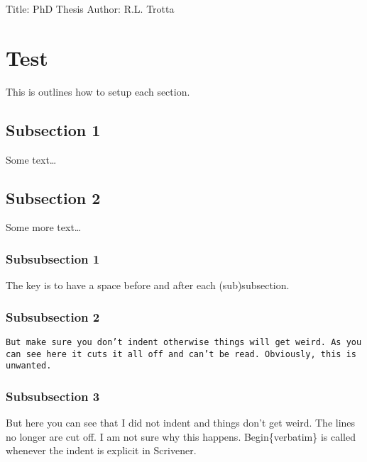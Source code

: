 \documentclass[
]{report}
\author{}
\date{}
\begin{document}
Title: PhD Thesis Author: R.L. Trotta

\label{Chapter-1}

\hypertarget{Section-1.1}{%
\section{Test}\label{Section-1.1}}

This is outlines how to setup each section.

\hypertarget{subsection-1}{%
\subsection{Subsection 1}\label{subsection-1}}

Some text\ldots{}

\hypertarget{subsection-2}{%
\subsection{Subsection 2}\label{subsection-2}}

Some more text\ldots{}

\hypertarget{subsubsection-1}{%
\subsubsection{Subsubsection 1}\label{subsubsection-1}}

The key is to have a space before and after each (sub)subsection.

\hypertarget{subsubsection-2}{%
\subsubsection{Subsubsection 2}\label{subsubsection-2}}

\begin{verbatim}
But make sure you don’t indent otherwise things will get weird. As you can see here it cuts it all off and can’t be read. Obviously, this is unwanted.
\end{verbatim}

\hypertarget{subsubsection-3}{%
\subsubsection{Subsubsection 3}\label{subsubsection-3}}

But here you can see that I did not indent and things don't get weird.
The lines no longer are cut off. I am not sure why this happens.
Begin\{verbatim\} is called whenever the indent is explicit in
Scrivener.
\end{document}
